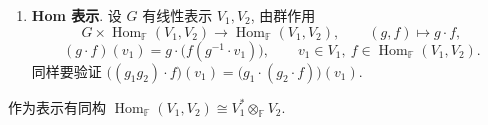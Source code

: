\begin{example}
\begin{enumerate}
特别地, 若 $G$ 为有限群且 $\mathbb{F}=\mathbb{C}$, 仍记 $g(\alpha_1,\dots,\alpha_n)=(\alpha_1,\dots,\alpha_n)A$. 由 $g$ 的阶有限, $A$ 可对角化, 设 $A\sim\operatorname{diag}(\lambda_1,\dots,\lambda_n)$, 且 $\lambda_i^m=1$ 对某个 $m$ 成立, 于是 $|\lambda_i|=1$, 从而 $\overline{\lambda_i}=\lambda_i^{-1}$. 因此
\[
  \operatorname{Tr}(A^{-1})=\sum_i\lambda_i^{-1}=\sum_i\overline{\lambda_i}=\overline{\operatorname{Tr}(A)},\qquad\text{即}\qquad \operatorname{Tr}_{\rho^*}(g)=\overline{\operatorname{Tr}_\rho(g)} .
\]
特别地, $\chi_\rho$ 取实值当且仅当 $\operatorname{Tr}_{\rho^*}=\operatorname{Tr}_\rho$.

\item \textbf{Hom 表示}. 设 $G$ 有线性表示 $V_1,V_2$, 由群作用
\begin{equation*}
  G\times\operatorname{Hom}_{\mathbb{F}}(V_1,V_2)\longrightarrow\operatorname{Hom}_{\mathbb{F}}(V_1,V_2),\qquad (g,f)\longmapsto g\cdot f,
\end{equation*}
\begin{equation*}
  (g\cdot f)(v_1)=g\cdot\bigl(f(g^{-1}\cdot v_1)\bigr),\qquad v_1\in V_1,\ f\in\operatorname{Hom}_{\mathbb{F}}(V_1,V_2).
\end{equation*}
同样要验证 $\bigl((g_1g_2)\cdot f\bigr)(v_1)=\bigl(g_1\cdot(g_2\cdot f)\bigr)(v_1)$.
\end{enumerate}
\end{example}

\begin{proposition}\label{prop:hom-tensor}
作为表示有同构 $\operatorname{Hom}_{\mathbb{F}}(V_1,V_2)\cong V_1^*\otimes_{\mathbb{F}} V_2$.
\end{proposition}

